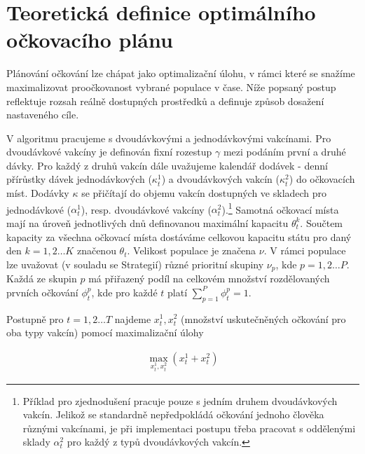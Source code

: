 \section*{Teoretická definice optimálního očkovacího plánu} 
\label{sec_vypocet}

Plánování očkování lze chápat jako optimalizační úlohu, v rámci které se snažíme maximalizovat proočkovanost vybrané populace v čase. Níže popsaný postup reflektuje rozsah reálně dostupných prostředků a definuje způsob dosažení nastaveného cíle.


V algoritmu pracujeme s dvoudávkovými a jednodávkovými vakcínami. Pro dvoudávkové vakcíny je definován fixní rozestup $\gamma$ mezi podáním první a druhé dávky. Pro každý z druhů vakcín dále uvažujeme kalendář dodávek - denní přírůstky dávek jednodávkových ($\kappa_{t}^{1}$) a dvoudávkových vakcín ($\kappa_{t}^{2}$) do očkovacích míst. Dodávky $\kappa$ se přičítají do objemu vakcín dostupných ve skladech pro jednodávkové ($\alpha_{t}^{1}$), resp. dvoudávkové vakcíny ($\alpha_{t}^{2}$).\footnote{Příklad pro zjednodušení pracuje pouze s jedním druhem dvoudávkových vakcín. Jelikož se standardně nepředpokládá očkování jednoho člověka různými vakcínami, je při implementaci postupu třeba pracovat s oddělenými sklady $\alpha_{t}^{2}$ pro každý z typů dvoudávkových vakcín.} 
Samotná očkovací místa mají na úroveň jednotlivých dnů definovanou maximální kapacitu $\theta_{t}^{k}$. Součtem kapacity za všechna očkovací místa dostáváme celkovou kapacitu státu pro daný den $k=1,2 \dots K$ značenou $\theta_{t}$.
%
Velikost populace je značena $\nu$. V rámci populace lze uvažovat (v souladu se Strategií) různé prioritní skupiny $\nu_{p}$, kde $p=1,2\dots P$. Každá ze skupin $p$ má přiřazený podíl na celkovém množství rozdělovaných prvních očkování $\phi_{t}^{p}$, kde pro každé $t$ platí $\sum_{p=1}^{P}\phi_{t}^{p}=1$. 

%
Postupně pro $t=1,2 \dots T$ najdeme $x_{t}^{1},x_{t}^{2}$ (množství uskutečněných očkování pro oba typy vakcín) pomocí maximalizační úlohy

\begin{equation}
\begin{aligned}
\max_{x_{t}^{1},x_{t}^{2}}(x_{t}^{1}+x_{t}^{2})
\end{aligned}
\end{equation}

